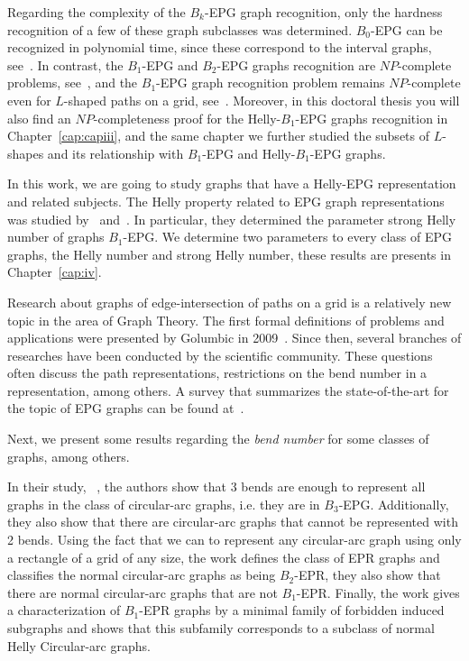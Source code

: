 Regarding the complexity of the $B_k$-EPG graph recognition, only the hardness recognition of a few of these graph subclasses was determined.  $ B_0$-EPG can be recognized in polynomial time, since these correspond to the interval graphs, see~\cite{booth1976}. In contrast, the $ B_1$-EPG and $ B_2$-EPG graphs recognition are $ NP$-complete problems, see~\cite{heldt2014, martin2017}, and the $ B_1$-EPG graph recognition problem remains $ NP$-complete even  for $ L$-shaped paths on a grid, see~\cite{cameron2016edge}. Moreover, in this doctoral thesis you will also find an $ NP$-completeness proof  for the  Helly-$B_1$-EPG graphs recognition in Chapter~\ref{cap:capiii}, and the same chapter we further studied the subsets of $L$-shapes and its relationship with $B_1$-EPG and Helly-$B_1$-EPG graphs.

In this work, we are going to study graphs that have a Helly-EPG representation and related subjects.  The Helly property related to EPG graph representations was studied by~\cite{golumbic2009} and~\cite{golumbic2013}. In particular, they determined the parameter strong Helly number of graphs $ B_1$-EPG. We determine two parameters to every class of EPG graphs, the Helly number and strong Helly number, these results are presents in Chapter~\ref{cap:iv}.

Research about graphs of edge-intersection of  paths on a grid is a relatively new topic in the area of Graph Theory. The first formal definitions of problems and applications were presented by Golumbic in 2009~\cite{golumbic2009}. Since then, several branches of researches have been conducted by the scientific community. These questions often discuss the path representations, restrictions on the bend number in a representation, among others. 
A survey that summarizes the state-of-the-art for the topic of EPG graphs can be found at~\cite{chung201950}. 

Next, we present  some results regarding the  \emph{bend number} for some classes of graphs, among others.

In their study, \citeauthor{alcon2016}~\cite{alcon2016}, the authors show that 3 bends are enough to represent all graphs in the class of circular-arc graphs, i.e. they are in $ B_3$-EPG. Additionally, they also show that there are circular-arc graphs that cannot be represented with 2 bends. Using the fact that we can to represent any circular-arc graph using only a rectangle of a grid of any size, the work defines the class of EPR graphs and classifies the normal circular-arc graphs  as being $ B_2$-EPR, they also show that there are normal circular-arc graphs that are not $ B_1$-EPR. Finally, the work gives a characterization of $ B_1$-EPR graphs by a minimal family of forbidden induced subgraphs and shows that this subfamily corresponds to a subclass of normal Helly Circular-arc graphs.


